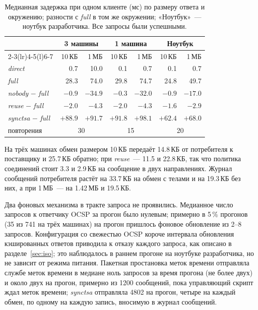 \documentclass[conference,a4paper]{IEEEtran}
\begin{document}
\begin{table}[!htb]
\centering\footnotesize
\setlength{\tabcolsep}{3.5pt}
\caption{Медианная задержка при одном клиенте (мс) по размеру ответа и окружению; разности с
\emph{full} в том же окружении; «Ноутбук»~--- ноутбук разработчика. Все запросы были успешными.}
\label{tab:onecl}
\begin{tabular}{@{}lrrrrrr@{}}
\toprule
& \multicolumn{2}{c}{3 машины} & \multicolumn{2}{c}{1 машина} & \multicolumn{2}{c}{Ноутбук} \\
\cmidrule(lr){2-3}\cmidrule(lr){4-5}\cmidrule(l){6-7}
& 10\,КБ & 1\,МБ & 10\,КБ & 1\,МБ & 10\,КБ & 1\,МБ \\
\midrule
\emph{direct} & 0.7 & 10.0 & 0.1 & 0.7 & 0.1 & 0.7 \\
\emph{full} & 28.3 & 74.0 & 29.8 & 74.7 & 24.8 & 49.7 \\
\emph{nobody} $-$ \emph{full} & $-0.9$ & $-34.9$ & $-0.3$ & $-32.0$ & $-0.9$ & $-17.0$ \\
\emph{reuse} $-$ \emph{full} & $-2.0$ & $-4.3$ & $-2.0$ & $-4.3$ & $-1.6$ & $-2.9$ \\
\emph{synctsa} $-$ \emph{full} & $+88.9$ & $+91.7$ & $+91.8$ & $+98.1$ & $+62.4$ & $+68.0$ \\
\midrule
повторения & \multicolumn{2}{c}{30} & \multicolumn{2}{c}{15} & \multicolumn{2}{c}{20} \\
\bottomrule
\end{tabular}
\end{table}

На трёх машинах обмен размером 10\,КБ передаёт 14.8\,КБ от потребителя к поставщику и 25.7\,КБ обратно;
при \emph{reuse}~--- 11.5 и 22.8\,КБ, так что политика соединений стоит 3.3 и 2.9\,КБ на сообщение в
двух направлениях. Журнал сообщений потребителя растёт на 33.7\,КБ на обмен с телами и на
19.3\,КБ без них, а при 1\,МБ~--- на 1.42\,МБ и 19.5\,КБ.

Два фоновых механизма в тракте запроса не проявились. Медианное число запросов к
ответчику OCSP за прогон было нулевым; примерно в 5\,\% прогонов (35 из 741 на трёх машинах) на
прогон пришлось фоновое обновление из 2--8 запросов. Конфигурация со свежестью OCSP
короче интервала обновления кэшированных ответов приводила к отказу каждого запроса, как описано в
разделе~\ref{sec:iso}; это наблюдалось в раннем прогоне на ноутбуке разработчика, но не зависит от
режима питания. Пакетная простановка меток времени отправляла службе меток времени в медиане ноль запросов
за время прогона (не более двух) и около двух на прогон, примерно из 1200 сообщений, пока управляющий скрипт ждал
меток времени; \emph{synctsa} отправляла 4802 на прогон, четыре на каждый обмен, по одному на
каждую запись, вносимую в журнал сообщений.
\end{document}
